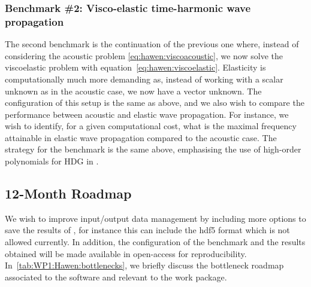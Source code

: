 \subsubsection{Benchmark \#2: Visco-elastic time-harmonic wave propagation}

The second benchmark is the continuation of the previous one where, instead 
of considering the acoustic problem \eqref{eq:hawen:viscoacoustic}, we now
solve the viscoelastic problem with equation~\eqref{eq:hawen:viscoelastic}.
Elasticity is computationally much more demanding as, instead of working with
a scalar unknown as in the acoustic case, we now have a vector unknown. 
The configuration of this setup is the same as above, and we also wish to 
compare the performance between acoustic and elastic wave propagation. 
For instance, we wish to identify, for a given computational cost, what 
is the maximal frequency attainable in elastic wave propagation compared to
the acoustic case.
The strategy for the benchmark is the same above, emphasising the use of 
high-order polynomials for HDG in \hawen.


\subsection{12-Month Roadmap}
\label{sec:WP1:Hawen:roadmap}



We wish to improve input/output data management by including more options 
to save the results of \hawen, for instance this can include the hdf5 format
which is not allowed currently.
In addition, the configuration of the benchmark and the results obtained will 
be made available in open-access for reproducibility.
In~\cref{tab:WP1:Hawen:bottlenecks}, we briefly discuss the bottleneck roadmap associated to the software and relevant to the work package.

